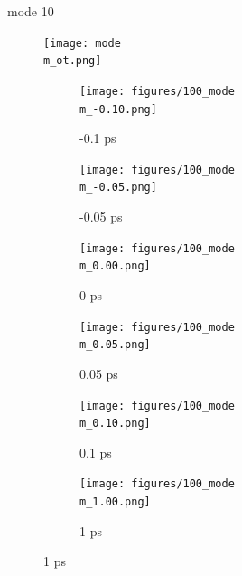 \documentclass{beamer}
\newcommand\w{0.32}
\begin{document}
\renewcommand\m{10}
\begin{frame}{mode \m}
		\vspace{\vh mm}
	\begin{figure}
		\centering
		\texttt{[image: mode\\m\_ot.png]}
	\end{figure}
	\begin{figure}
		\centering
		\begin{subfigure}[b]{\w\textwidth}
			\centering
			\texttt{[image: figures/100\_mode\\m\_-0.10.png]}
			\caption{-0.1 ps}
		\end{subfigure}
		\begin{subfigure}[b]{\w\textwidth}
			\centering
			\texttt{[image: figures/100\_mode\\m\_-0.05.png]}
			\caption{-0.05 ps}
		\end{subfigure}
		\begin{subfigure}[b]{\w\textwidth}
			\centering
			\texttt{[image: figures/100\_mode\\m\_0.00.png]}
			\caption{0 ps}
		\end{subfigure}
		\begin{subfigure}[b]{\w\textwidth}
			\centering
			\texttt{[image: figures/100\_mode\\m\_0.05.png]}
			\caption{0.05 ps}
		\end{subfigure}
		\begin{subfigure}[b]{\w\textwidth}
			\centering
			\texttt{[image: figures/100\_mode\\m\_0.10.png]}
			\caption{0.1 ps}
		\end{subfigure}
		\begin{subfigure}[b]{\w\textwidth}
			\centering
			\texttt{[image: figures/100\_mode\\m\_1.00.png]}
			\caption{1 ps}
		\end{subfigure}
	\end{figure}
\end{frame}
\end{document}
